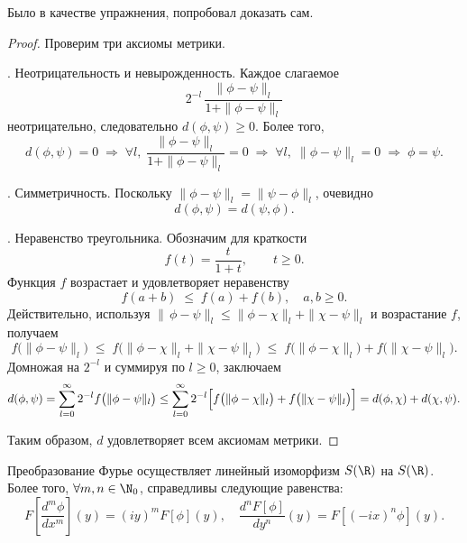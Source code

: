 \begin{note}
Было в качестве упражнения, попробовал доказать сам.
\end{note}
\begin{proof}
Проверим три аксиомы метрики.

\medskip
{}. Неотрицательность и невырожденность.
Каждое слагаемое 
\[
2^{-l}\,\frac{\|\phi-\psi\|_l}{1+\|\phi-\psi\|_l}
\]
неотрицательно, следовательно $d(\phi,\psi)\ge0$. Более того, 
\[
d(\phi,\psi)=0
\;\Longrightarrow\;
\forall l,\;\frac{\|\phi-\psi\|_l}{1+\|\phi-\psi\|_l}=0
\;\Longrightarrow\;
\forall l,\;\|\phi-\psi\|_l=0
\;\Longrightarrow\;
\phi=\psi.
\]

\medskip
{}. Симметричность.
Поскольку $\|\phi-\psi\|_l=\|\psi-\phi\|_l$, очевидно
\[
d(\phi,\psi)=d(\psi,\phi).
\]

\medskip
{}. Неравенство треугольника.
Обозначим для краткости 
\[
f(t)=\frac{t}{1+t},\qquad t\ge0.
\]
Функция $f$ возрастает и удовлетворяет неравенству
\[
f(a+b)\;\le\;f(a)+f(b),
\quad a,b\ge0.
\]
Действительно, используя
\(\|\,\phi-\psi\|_l\le\|\phi-\chi\|_l+\|\chi-\psi\|_l\) и возрастание $f$, получаем
\[
f\bigl(\|\phi-\psi\|_l\bigr)
\;\le\;
f\bigl(\|\phi-\chi\|_l+\|\chi-\psi\|_l\bigr)
\;\le\;
f\bigl(\|\phi-\chi\|_l\bigr)
+f\bigl(\|\chi-\psi\|_l\bigr).
\]
Домножая на $2^{-l}$ и суммируя по $l\ge0$, заключаем
\[
d(\phi,\psi)
=\sum_{l=0}^\infty2^{-l}f\bigl(\|\phi-\psi\|_l\bigr)
\le
\sum_{l=0}^\infty2^{-l}\Bigl[f\bigl(\|\phi-\chi\|_l\bigr)
+f\bigl(\|\chi-\psi\|_l\bigr)\Bigr]
=d(\phi,\chi)+d(\chi,\psi).
\]

Таким образом, $d$ удовлетворяет всем аксиомам метрики.
\end{proof}
\begin{theorem}
    Преобразование Фурье осуществляет линейный изоморфизм $S(\R)$ на $S(\R)$.
    Более того, $\forall m, n \in \N_0$, справедливы следующие равенства:
    \[
        F\left[\dfrac{d^m \phi}{dx^m}\right](y) = (iy)^m F[\phi](y), \quad \dfrac{d^n F[\phi]}{dy^n}(y) = F[(-ix)^n \phi](y).
    \]
\end{theorem}
